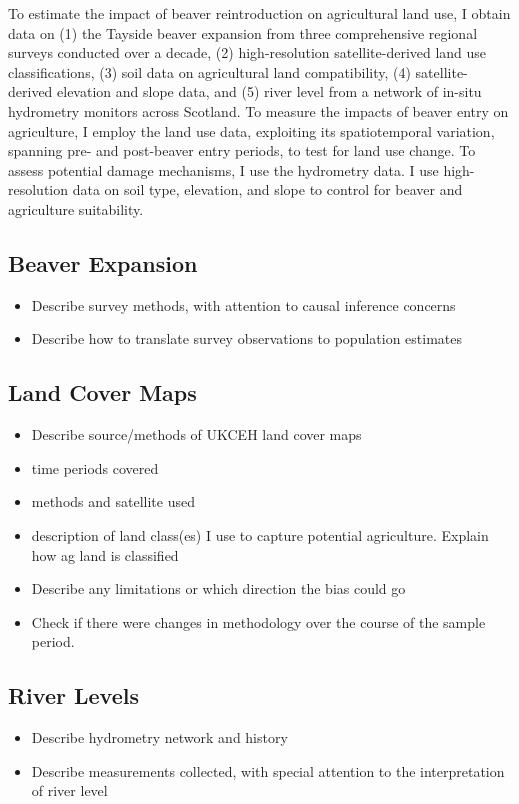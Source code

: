To estimate the impact of beaver reintroduction on agricultural land use, I obtain data on (1) the Tayside beaver expansion from three comprehensive regional surveys conducted over a decade, (2) high-resolution satellite-derived land use classifications, (3) soil data on agricultural land compatibility, (4) satellite-derived elevation and slope data, and (5) river level from a network of in-situ hydrometry monitors across Scotland. To measure the impacts of beaver entry on agriculture, I employ the land use data, exploiting its spatiotemporal variation, spanning pre- and post-beaver entry periods, to test for land use change. To assess potential damage mechanisms, I use the hydrometry data. I use high-resolution data on soil type, elevation, and slope to control for beaver and agriculture suitability.

\subsection{Beaver Expansion}
\begin{itemize}
    \item Describe survey methods, with attention to causal inference concerns
    \item Describe how to translate survey observations to population estimates
\end{itemize}

\subsection{Land Cover Maps}
\begin{itemize}
    \item Describe source/methods of UKCEH land cover maps
    \item time periods covered
    \item methods and satellite used
    \item description of land class(es) I use to capture potential agriculture. Explain how ag land is classified
    \item Describe any limitations or which direction the bias could go
    \item Check if there were changes in methodology over the course of the sample period.
\end{itemize}

\subsection{River Levels}
\begin{itemize}
    \item Describe hydrometry network and history
    \item Describe measurements collected, with special attention to the interpretation of river level
\end{itemize}

